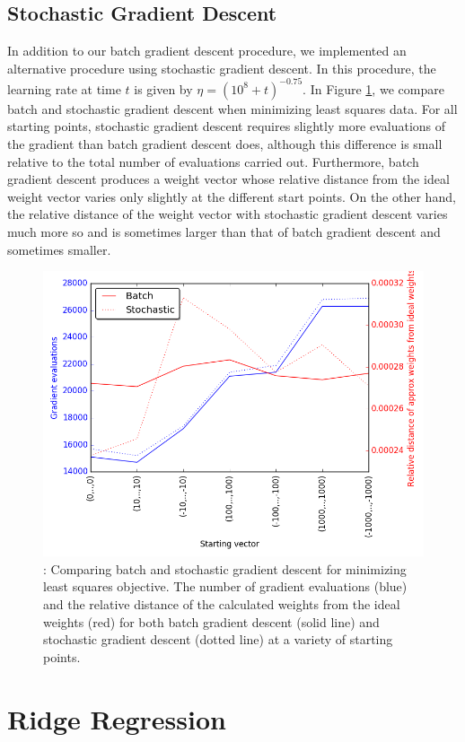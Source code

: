 \documentclass[10pt]{article}
\begin{document}
\subsection{Stochastic Gradient Descent}

In addition to our batch gradient descent procedure, we implemented an alternative procedure using stochastic gradient descent. In this procedure, the learning rate at time $t$ is given by $\eta = (10^8 +t)^{-0.75}$. In Figure \ref{fig:1.3}, we compare batch and stochastic gradient descent when minimizing least squares data. For all starting points, stochastic gradient descent requires slightly more evaluations of the gradient than batch gradient descent does, although this difference is small relative to the total number of evaluations carried out. Furthermore, batch gradient descent produces a weight vector whose relative distance from the ideal weight vector varies only slightly at the different start points. On the other hand, the relative distance of the weight vector with stochastic gradient descent varies much more so and is sometimes larger than that of batch gradient descent and sometimes smaller.


\begin{figure}
\centering
\includegraphics[width=.4\textwidth,height =0.25\textheight]{batch_stochastic_comp.png}
\caption{\label{fig:1.3}: Comparing batch and stochastic gradient descent for minimizing least squares objective. The number of gradient evaluations (blue) and the relative distance of the calculated weights from the ideal weights (red) for both batch gradient descent (solid line) and stochastic gradient descent (dotted line) at a variety of starting points.}
\end{figure}

\section{Ridge Regression}
\end{document}
